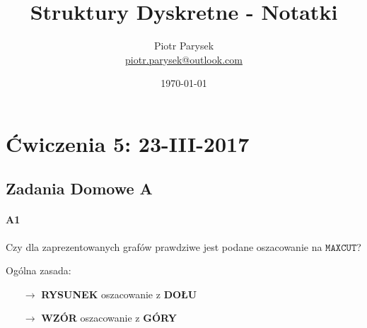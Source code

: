 \documentclass[a4paper,12pt]{article}
\title{Struktury Dyskretne - Notatki}
\author{Piotr Parysek\\
\href{mailto:piotr.parysek@outlook.com}{piotr.parysek@outlook.com} }
\date{\today}
\theoremstyle{definition}%
\theoremstyle{definition}
\theoremstyle{problem}
\begin{document}
\maketitle

\tableofcontents
\section{Ćwiczenia 5: 23-III-2017}

\subsection{Zadania Domowe A}
\paragraph{A1} Czy dla zaprezentowanych grafów prawdziwe jest podane oszacowanie na $\mathtt{MAX CUT}$?

Ogólna zasada:
\begin{itemize}
\item[$\rightarrow$] \textbf{RYSUNEK} oszacowanie z \textbf{DOŁU}
\item[$\rightarrow$] \textbf{WZÓR} oszacowanie z \textbf{GÓRY}
\end{itemize}
\end{document}
